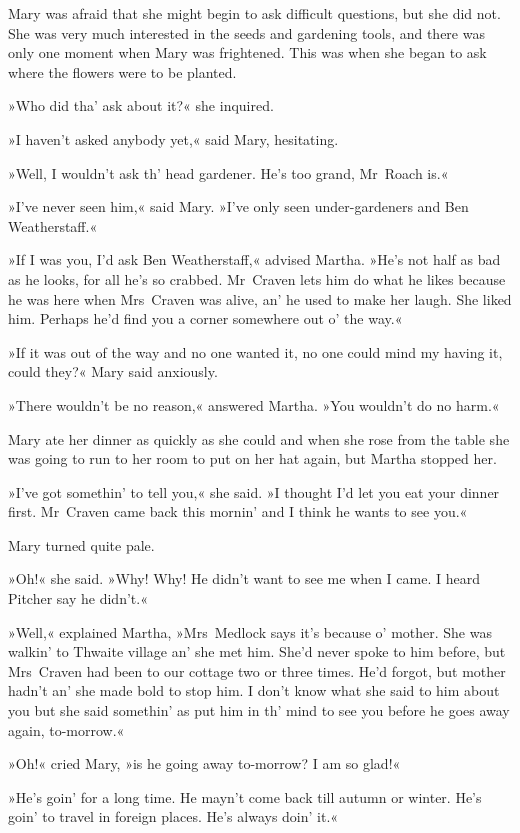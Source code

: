 Mary was afraid that she might begin to ask difficult questions, but she did not. She was very much interested in the seeds and gardening tools, and there was only one moment when Mary was frightened. This was when she began to ask where the flowers were to be planted.

»Who did tha' ask about it?« she inquired.

»I haven't asked anybody yet,« said Mary, hesitating.

»Well, I wouldn't ask th' head gardener. He's too grand, Mr~Roach is.«

»I've never seen him,« said Mary. »I've only seen under-gardeners and Ben Weatherstaff.«

»If I was you, I'd ask Ben Weatherstaff,« advised Martha. »He's not half as bad as he looks, for all he's so crabbed. Mr~Craven lets him do what he likes because he was here when Mrs~Craven was alive, an' he used to make her laugh. She liked him. Perhaps he'd find you a corner somewhere out o' the way.«

»If it was out of the way and no one wanted it, no one could mind my having it, could they?« Mary said anxiously.

»There wouldn't be no reason,« answered Martha. »You wouldn't do no harm.«

Mary ate her dinner as quickly as she could and when she rose from the table she was going to run to her room to put on her hat again, but Martha stopped her.

»I've got somethin' to tell you,« she said. »I thought I'd let you eat your dinner first. Mr~Craven came back this mornin' and I think he wants to see you.«

Mary turned quite pale.

»Oh!« she said. »Why! Why! He didn't want to see me when I came. I heard Pitcher say he didn't.«

»Well,« explained Martha, »Mrs~Medlock says it's because o' mother. She was walkin' to Thwaite village an' she met him. She'd never spoke to him before, but Mrs~Craven had been to our cottage two or three times. He'd forgot, but mother hadn't an' she made bold to stop him. I don't know what she said to him about you but she said somethin' as put him in th' mind to see you before he goes away again, to-morrow.«

»Oh!« cried Mary, »is he going away to-morrow? I am so glad!«

»He's goin' for a long time. He mayn't come back till autumn or winter. He's goin' to travel in foreign places. He's always doin' it.«


